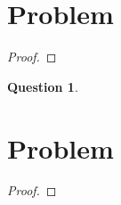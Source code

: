 \documentclass[a4paper,12pt]{article}
\newenvironment{solution}{\renewcommand{\proofname}{Solution}\begin{proof}}{\end{proof}}
\newtheorem{question}{Question}
\begin{document}
\section{Problem}
\lipsum[1]
\begin{solution}
   \lipsum[2] 
\end{solution}

\begin{question}
    \lipsum[3]
\end{question}

\newpage

\section{Problem}
\lipsum[1]
\begin{proof}
   \lipsum[2] 
\end{proof}
\end{document}
